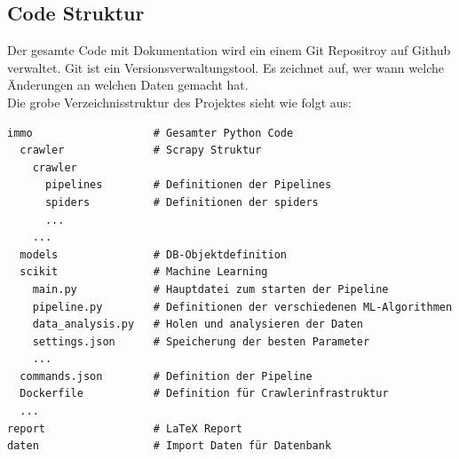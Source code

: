\subsection{Code Struktur}
Der gesamte Code mit Dokumentation wird ein einem Git Repositroy auf Github verwaltet. Git ist ein Versionsverwaltungstool. Es zeichnet auf, wer wann welche Änderungen an welchen Daten gemacht hat.\\
Die grobe Verzeichnisstruktur des Projektes sieht wie folgt aus:
\begin{verbatim}
immo                   # Gesamter Python Code
  crawler              # Scrapy Struktur
    crawler
      pipelines        # Definitionen der Pipelines
      spiders          # Definitionen der spiders
      ...
    ...
  models               # DB-Objektdefinition
  scikit               # Machine Learning
    main.py            # Hauptdatei zum starten der Pipeline
    pipeline.py        # Definitionen der verschiedenen ML-Algorithmen
    data_analysis.py   # Holen und analysieren der Daten
    settings.json      # Speicherung der besten Parameter
    ...
  commands.json        # Definition der Pipeline
  Dockerfile           # Definition für Crawlerinfrastruktur
  ...
report                 # LaTeX Report
daten                  # Import Daten für Datenbank
\end{verbatim}
